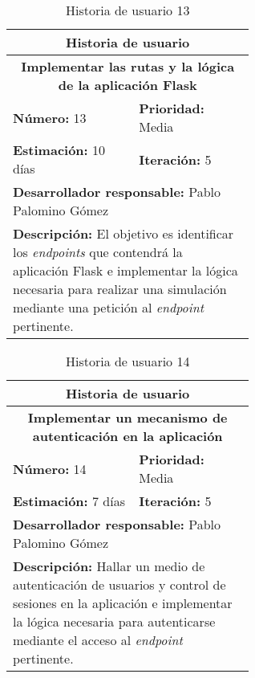 \begin{table}[H]
        \centering
        \begin{tabular}{|p{0.3\linewidth}|p{0.3\linewidth}|}
          \hline
          \multicolumn{2}{|c|}{Historia de usuario}\\ \hline
          \multicolumn{2}{|c|}{\textbf{Implementar las rutas y la lógica de la aplicación Flask}}\\ \hline
          \textbf{Número:} 13 & \textbf{Prioridad:} Media\\ \hline
          \textbf{Estimación:} 10 días & \textbf{Iteración:} 5\\ \hline
          \multicolumn{2}{|l|}{\textbf{Desarrollador responsable:} Pablo Palomino Gómez}\\ \hline
          \multicolumn{2}{|p{0.6\linewidth}|}{\textbf{Descripción:} El objetivo es identificar los \textit{endpoints} que contendrá la aplicación Flask e implementar la lógica necesaria para realizar una simulación mediante una petición al \textit{endpoint} pertinente.}\\ \hline
        \end{tabular}
        \caption{Historia de usuario 13}
        \label{tab:hist13}
\end{table}
\begin{table}[H]
        \centering
        \begin{tabular}{|p{0.3\linewidth}|p{0.3\linewidth}|}
          \hline
          \multicolumn{2}{|c|}{Historia de usuario}\\ \hline
          \multicolumn{2}{|c|}{\textbf{Implementar un mecanismo de autenticación en la aplicación}}\\ \hline
          \textbf{Número:} 14 & \textbf{Prioridad:} Media\\ \hline
          \textbf{Estimación:} 7 días & \textbf{Iteración:} 5\\ \hline
          \multicolumn{2}{|l|}{\textbf{Desarrollador responsable:} Pablo Palomino Gómez}\\ \hline
          \multicolumn{2}{|p{0.6\linewidth}|}{\textbf{Descripción:} Hallar un medio de autenticación de usuarios y control de sesiones en la aplicación e implementar la lógica necesaria para autenticarse mediante el acceso al \textit{endpoint} pertinente.}\\ \hline
        \end{tabular}
        \caption{Historia de usuario 14}
        \label{tab:hist14}
\end{table}
